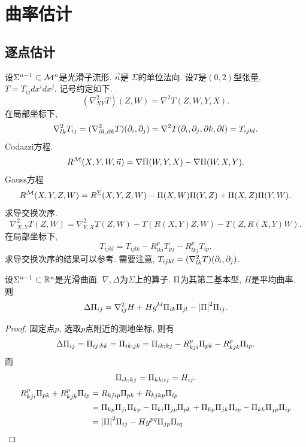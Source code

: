 \chapter{曲率估计}
\section{逐点估计}
设$\Sigma^{n-1} \subset {\mathcal{M}}^n$是光滑子流形. $\vec{n}$是 $\Sigma$的单位法向. 设$T$是$(0,2)$型张量, $T=T_{ij}dx^idx^j$. 记号约定如下.
\begin{equation}
    (\nabla^2_{XY}T)(Z,W)=\nabla^2T(Z,W,Y,X).
\end{equation}
在局部坐标下,
\begin{equation}
    \nabla^2_{lk}T_{ij}=(\nabla^2_{\partial l,\partial k}T)({\partial_i},{\partial_j})=\nabla^2T({\partial_i},{\partial_j}, \partial k,\partial l)=T_{ijkl}.
\end{equation}
Codazzi方程.
\begin{equation}
    R^{\mathcal{M}}(X,Y,W,\vec{n}) = \nabla {\Pi}(W,Y,X) - \nabla {\Pi} (W,X,Y).
\end{equation}
Gauss方程
\begin{equation}
    R^{\mathcal{M}}(X,Y,Z,W) = R^\Sigma(X,Y,Z,W)-{\Pi}(X,W){\Pi}(Y,Z)+{\Pi}(X,Z){\Pi}(Y,W).
\end{equation}
求导交换次序.
\begin{equation}
    \nabla^2_{X,Y}T(Z,W) = \nabla^2_{Y,X}T(Z,W)-T(R(X,Y)Z,W)-T(Z,R(X,Y)W).
\end{equation}
在局部坐标下,
\begin{equation}
    T_{ijkl}=T_{ijlk}-R_{lki}^pT_{pj}-R_{lkj}^pT_{ip}.
\end{equation}
求导交换次序的结果可以参考\cite[定理7.14]{lee}. 需要注意, $T_{ijkl}=(\nabla^2_{lk}T)({\partial_i},{\partial_j})$.  
\begin{proposition}
    设$\Sigma^{n-1} \subset {\mathbb{R}}^n$是光滑曲面. $\nabla, \Delta$为$\Sigma$上的算子. ${\Pi}$为其第二基本型, $H$是平均曲率. 则
    \begin{equation} \label{simon1}
        \Delta {\Pi}_{ij}=\nabla^2_{ij}H + Hg^{kl}{\Pi}_{ik}{\Pi}_{jl}-{\left | {\Pi} \right |}^2{\Pi}_{ij}.
    \end{equation}
\end{proposition}
\begin{proof}
    固定点$p$, 选取$p$点附近的测地坐标, 则有
    \begin{equation}
        \Delta {\Pi}_{ij}={\Pi}_{ij;kk}={\Pi}_{ik;jk}={\Pi}_{ik;kj}-R_{kji}^p{\Pi}_{pk}-R_{kjk}^p{\Pi}_{ip}.
    \end{equation}
    而
    \begin{equation}
        {\Pi}_{ik;kj}={\Pi}_{kk;ij}=H_{ij}.
    \end{equation}
    \begin{equation}
        \begin{split}
            R_{kji}^p{\Pi}_{pk}+R_{kjk}^p{\Pi}_{ip} &= R_{kjip}{\Pi}_{pk}+R_{kjkp}{\Pi}_{ip}\\
            &={\Pi}_{kp}{\Pi}_{ji}{\Pi}_{kp}-{\Pi}_{ki}{\Pi}_{jp}{\Pi}_{pk}+{\Pi}_{kp}{\Pi}_{jk}{\Pi}_{ip}-{\Pi}_{kk}{\Pi}_{jp}{\Pi}_{ip} \\
            &={\left | {\Pi} \right |}^2{\Pi}_{ij}-Hg^{pq}{\Pi}_{jp}{\Pi}_{iq}
        \end{split}
    \end{equation}
\end{proof}
